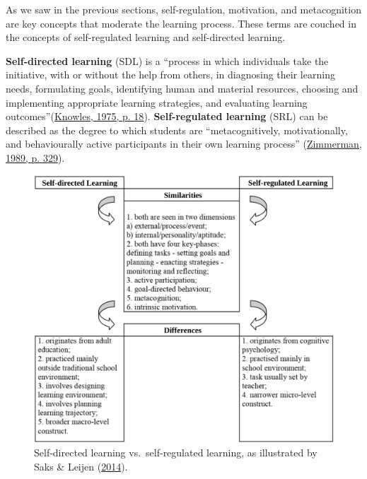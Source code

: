 \documentclass[letterpaper, nobind]{templates/ociamthesis}
\begin{document}
As we saw in the previous sections, self-regulation, motivation, and
metacognition are key concepts that moderate the learning process. These
terms are couched in the concepts of self-regulated learning and
self-directed learning.

\textbf{Self-directed learning} (SDL) is a ``process in which individuals take
the initiative, with or without the help from others, in diagnosing
their learning needs, formulating goals, identifying human and material
resources, choosing and implementing appropriate learning strategies,
and evaluating learning outcomes''(\protect\hyperlink{ref-knowles1975self}{Knowles, 1975, p. 18}).
\textbf{Self-regulated learning} (SRL) can be described as the degree to
which students are ``metacognitively, motivationally, and behaviourally
active participants in their own learning process'' (\protect\hyperlink{ref-zimmerman1989social}{Zimmerman, 1989, p. 329}).

\begin{figure}

{\centering \includegraphics[width=0.8\linewidth]{figs/sdl-v-srl} 

}

\caption[Self-directed learning vs.~self-regulated learning.]{Self-directed learning vs.~self-regulated learning, as illustrated by Saks \& Leijen (\protect\hyperlink{ref-saks2014distinguishing}{2014}).}\label{fig:sdl-v-srl}
\end{figure}
\end{document}

